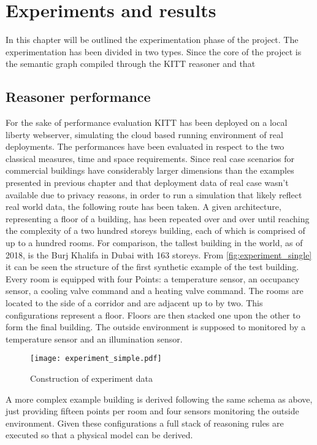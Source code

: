 \chapter{Experiments and results}
In this chapter will be outlined the experimentation phase of the project.
The experimentation has been divided in two types. Since the core of the project is the semantic graph compiled through the KITT reasoner and that
\section{Reasoner performance}
For the sake of performance evaluation KITT has been deployed on a local liberty webserver, simulating the cloud based running environment of real deployments.
The performances have been evaluated in respect to the two classical measures, time and space requirements. Since real case scenarios for commercial buildings have considerably larger dimensions than the examples presented in previous chapter and that deployment data of real case wasn't available due to privacy reasons, in order to run a simulation that likely reflect real world data, the following route has been taken.
A given architecture, representing a floor of a building, has been repeated over and over until reaching the complexity of a two hundred storeys building, each of which is comprised of up to a hundred rooms. For comparison, the tallest building in the world, as of 2018, is the Burj Khalifa in Dubai with 163 storeys. From \autoref{fig:experiment_single} it can be seen the structure of the first synthetic example of the test building. Every room is equipped with four Points: a temperature sensor, an occupancy sensor, a cooling valve command and a heating valve command. The rooms are located to the side of a corridor and are adjacent up to by two. This configurations represent a floor. Floors are then stacked one upon the other to form the final building. The outside environment is supposed to monitored by a temperature sensor and an illumination sensor.
\begin{figure}
  \centering
  \texttt{[image: experiment\_simple.pdf]}
  \caption{Construction of experiment data}
  \label{fig:experiment_single}
\end{figure}
A more complex example building is derived following the same schema as above, just providing fifteen points per room and four sensors monitoring the outside environment.
Given these configurations a full stack of reasoning rules are executed so that a physical model can be derived.
